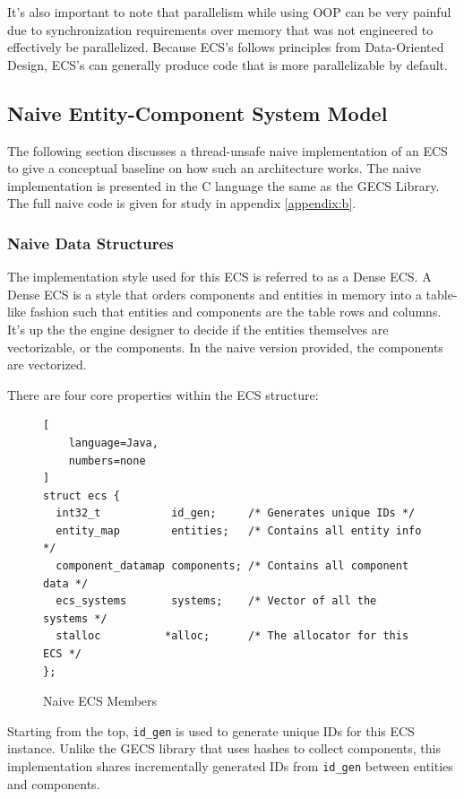 It's also important to note that parallelism while using OOP can be very painful due to synchronization requirements over memory that was not engineered to effectively be parallelized. Because ECS's follows principles from Data-Oriented Design, ECS's can generally produce code that is more parallelizable by default.\cite{RomeoPHD}

\subsection{Naive Entity-Component System Model}
\label{sec:ecs_naive}
The following section discusses a thread-unsafe naive implementation of an ECS to give a conceptual baseline on how such an architecture works. The naive implementation is presented in the C language the same as the GECS Library. The full naive code is given for study in appendix \ref{appendix:b}.

\subsubsection{Naive Data Structures}
The implementation style used for this ECS is referred to as a Dense ECS. \cite{EnTT_SparseSets} A Dense ECS is a style that orders components and entities in memory into a table-like fashion such that entities and components are the table rows and columns. It's up the the engine designer to decide if the entities themselves are vectorizable, or the components. In the naive version provided, the components are vectorized. 

There are four core properties within the ECS structure:

\begin{figure}[H]
\begin{lstlisting}[
    language=Java,
    numbers=none
]
struct ecs {
  int32_t           id_gen;     /* Generates unique IDs */
  entity_map        entities;   /* Contains all entity info */
  component_datamap components; /* Contains all component data */
  ecs_systems       systems;    /* Vector of all the systems */
  stalloc          *alloc;      /* The allocator for this ECS */
};
\end{lstlisting}
    \caption{Naive ECS Members}
    \label{code:naive_ecs_data}
\end{figure}

Starting from the top, \texttt{id\_gen} is used to generate unique IDs for this ECS instance. Unlike the GECS library that uses hashes to collect components, this implementation shares incrementally generated IDs from \texttt{id\_gen} between entities and components.


